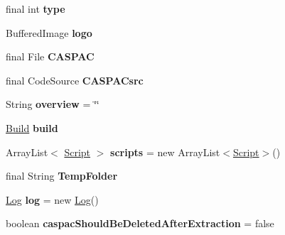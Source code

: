 \begin{DoxyCompactItemize}
\item 
\hypertarget{classCASUAL_1_1caspac_1_1Caspac_af2f8ec5ee442a10560736c9528196917}{final int {\bfseries type}}\label{classCASUAL_1_1caspac_1_1Caspac_af2f8ec5ee442a10560736c9528196917}

\item 
\hypertarget{classCASUAL_1_1caspac_1_1Caspac_a7ce54a828c27972ffe2736210726429d}{Buffered\-Image {\bfseries logo}}\label{classCASUAL_1_1caspac_1_1Caspac_a7ce54a828c27972ffe2736210726429d}

\item 
\hypertarget{classCASUAL_1_1caspac_1_1Caspac_a9c9f3568743699bb191d3b0451b4e2ac}{final File {\bfseries C\-A\-S\-P\-A\-C}}\label{classCASUAL_1_1caspac_1_1Caspac_a9c9f3568743699bb191d3b0451b4e2ac}

\item 
\hypertarget{classCASUAL_1_1caspac_1_1Caspac_a62673e4410829a0374ab80f2e0df5514}{final Code\-Source {\bfseries C\-A\-S\-P\-A\-Csrc}}\label{classCASUAL_1_1caspac_1_1Caspac_a62673e4410829a0374ab80f2e0df5514}

\item 
\hypertarget{classCASUAL_1_1caspac_1_1Caspac_a3f977939db32907dcf0eda3d9690f1dc}{String {\bfseries overview} = \char`\"{}\char`\"{}}\label{classCASUAL_1_1caspac_1_1Caspac_a3f977939db32907dcf0eda3d9690f1dc}

\item 
\hypertarget{classCASUAL_1_1caspac_1_1Caspac_a701528b95712562087956121c3ac32b5}{\hyperlink{classCASUAL_1_1caspac_1_1Caspac_1_1Build}{Build} {\bfseries build}}\label{classCASUAL_1_1caspac_1_1Caspac_a701528b95712562087956121c3ac32b5}

\item 
\hypertarget{classCASUAL_1_1caspac_1_1Caspac_a6defca8ee3937326a2f87a3127aba3ae}{Array\-List$<$ \hyperlink{classCASUAL_1_1caspac_1_1Script}{Script} $>$ {\bfseries scripts} = new Array\-List$<$\hyperlink{classCASUAL_1_1caspac_1_1Script}{Script}$>$()}\label{classCASUAL_1_1caspac_1_1Caspac_a6defca8ee3937326a2f87a3127aba3ae}

\item 
\hypertarget{classCASUAL_1_1caspac_1_1Caspac_a0d08f91a30c7acd212dfeca5279b1cc2}{final String {\bfseries Temp\-Folder}}\label{classCASUAL_1_1caspac_1_1Caspac_a0d08f91a30c7acd212dfeca5279b1cc2}

\item 
\hypertarget{classCASUAL_1_1caspac_1_1Caspac_aa4c916e6978c449a2193d5192d78b60e}{\hyperlink{classCASUAL_1_1Log}{Log} {\bfseries log} = new \hyperlink{classCASUAL_1_1Log}{Log}()}\label{classCASUAL_1_1caspac_1_1Caspac_aa4c916e6978c449a2193d5192d78b60e}

\item 
\hypertarget{classCASUAL_1_1caspac_1_1Caspac_a5c99fb7f34bb528167142e1c18f51b81}{boolean {\bfseries caspac\-Should\-Be\-Deleted\-After\-Extraction} = false}\label{classCASUAL_1_1caspac_1_1Caspac_a5c99fb7f34bb528167142e1c18f51b81}

\end{DoxyCompactItemize}
